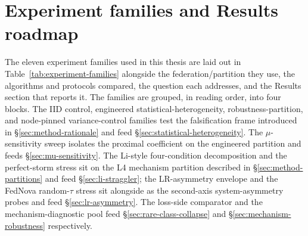 \documentclass[11pt,a4paper]{report}
\begin{document}
\section{Experiment families and Results roadmap}
\label{sec:method-roadmap}

The eleven experiment families used in this thesis are laid out in
Table~\ref{tab:experiment-families} alongside the federation/partition
they use, the algorithms and protocols compared, the question each
addresses, and the Results section that reports it. The families are
grouped, in reading order, into four blocks. The IID control,
engineered statistical-heterogeneity, robustness-partition, and
node-pinned variance-control families test the falsification frame
introduced in §\ref{sec:method-rationale} and feed
§\ref{sec:statistical-heterogeneity}. The $\mu$-sensitivity sweep
isolates the proximal coefficient on the engineered partition and feeds
§\ref{sec:mu-sensitivity}. The Li-style four-condition decomposition
and the perfect-storm stress sit on the L4 mechanism partition
described in §\ref{sec:method-partitions} and feed
§\ref{sec:li-straggler}; the LR-asymmetry envelope and the FedNova
random-$\tau$ stress sit alongside as the second-axis system-asymmetry
probes and feed §\ref{sec:lr-asymmetry}. The loss-side comparator and
the mechanism-diagnostic pool feed §\ref{sec:rare-class-collapse} and
§\ref{sec:mechanism-robustness} respectively.
\end{document}
